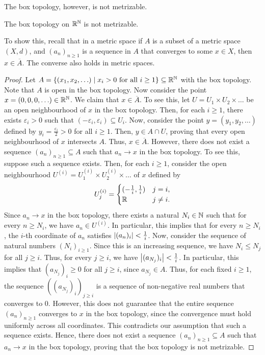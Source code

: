 The box topology, however, is not metrizable. 

\begin{lemma}
    The box topology on $\mathbb{R}^{\mathbb{N}}$ is not metrizable.
\end{lemma}
To show this, recall that in a metric space if $A$ is a subset of a metric space $(X,d)$, and $(a_{n})_{n \geq 1}$ is a sequence in $A$ that converges to some $x \in X$, then $x \in \overline{A}$. The converse also holds in metric spaces. 

\begin{proof}
    Let $A = \{(x_{1}, x_{2}, \ldots) \mid x_{i} > 0 \text{ for all } i \geq 1\} \subseteq \mathbb{R}^{\mathbb{N}}$ with the box topology. Note that $A$ is open in the box topology. Now consider the point $x = (0,0,0,\ldots) \in \mathbb{R}^{\mathbb{N}}$. We claim that $x \in \overline{A}$. To see this, let $U = U_{1} \times U_{2} \times \ldots$ be an open neighbourhood of $x$ in the box topology. Then, for each $i \geq 1$, there exists $\varepsilon_{i} > 0$ such that $(-\varepsilon_{i}, \varepsilon_{i}) \subseteq U_{i}$. Now, consider the point $y = (y_{1}, y_{2}, \ldots)$ defined by $y_{i} = \frac{\varepsilon_{i}}{2} > 0$ for all $i \geq 1$. Then, $y \in A \cap U$, proving that every open neighbourhood of $x$ intersects $A$. Thus, $x \in \overline{A}$.
    However, there does not exist a sequence $(a_{n})_{n \geq 1} \subseteq A$ such that $a_{n} \to x$ in the box topology. To see this, suppose such a sequence exists. Then, for each $i \geq 1$, consider the open neighbourhood $U^{(i)} = U_{1}^{(i)} \times U_{2}^{(i)} \times \ldots$ of $x$ defined by
    \begin{align}
        U_{j}^{(i)} = \begin{cases}
            (-\frac{1}{i}, \frac{1}{i}) & j = i, \\
            \mathbb{R} & j \neq i.
        \end{cases}
    \end{align}
    Since $a_{n} \to x$ in the box topology, there exists a natural $N_{i} \in \mathbb{N}$ such that for every $n \geq N_{i}$, we have $a_{n} \in U^{(i)}$. In particular, this implies that for every $n \geq N_{i}$, the $i$-th coordinate of $a_{n}$ satisfies $\left| (a_{n})_{i} \right| < \frac{1}{i}$. Now, consider the sequence of natural numbers $(N_{i})_{i \geq 1}$. Since this is an increasing sequence, we have $N_{i} \leq N_{j}$ for all $j \geq i$. Thus, for every $j \geq i$, we have $\left| (a_{N_{j}})_{i} \right| < \frac{1}{i}$. In particular, this implies that $(a_{N_{j}})_{i} \geq 0$ for all $j \geq i$, since $a_{N_{j}} \in A$. Thus, for each fixed $i \geq 1$, the sequence $((a_{N_{j}})_{i})_{j \geq i}$ is a sequence of non-negative real numbers that converges to $0$. However, this does not guarantee that the entire sequence $(a_{n})_{n \geq 1}$ converges to $x$ in the box topology, since the convergence must hold uniformly across all coordinates. This contradicts our assumption that such a sequence exists. Hence, there does not exist a sequence $(a_{n})_{n \geq 1} \subseteq A$ such that $a_{n} \to x$ in the box topology, proving that the box topology is not metrizable.
\end{proof}


